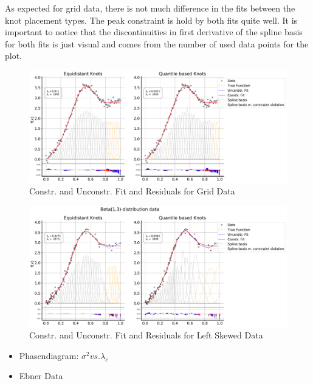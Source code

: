 \documentclass[10pt,a4paper]{article}
\begin{document}
As expected for grid data, there is not much difference in the fits between the knot placement types. The peak constraint is hold by both fits quite well. It is important to notice that the discontinuities in first derivative of the spline basis for both fits is just visual and comes from the number of used data points for the plot.


\begin{figure}[H]
	\centering
	\includegraphics[width=\columnwidth]{../thesisplots/exp_grid/exp_grid_ndata_250_rseed_1.pdf}
	\caption{Constr. and Unconstr. Fit and Residuals for Grid Data}
	\label{fig:fit_grid_250}
\end{figure}

\begin{figure}[H]
	\centering
	\includegraphics[width=\columnwidth]{../thesisplots/exp_beta/exp_left_skewed_data_ndata_250_rseed_1.pdf}
	\caption{Constr. and Unconstr. Fit and Residuals for Left Skewed Data}
	\label{fig:fit_left_skew_250}
\end{figure}

\begin{itemize}
	\item Phasendiagram: $\sigma^2 vs. \lambda_c$
	\item Ebner Data
\end{itemize}
\end{document}
